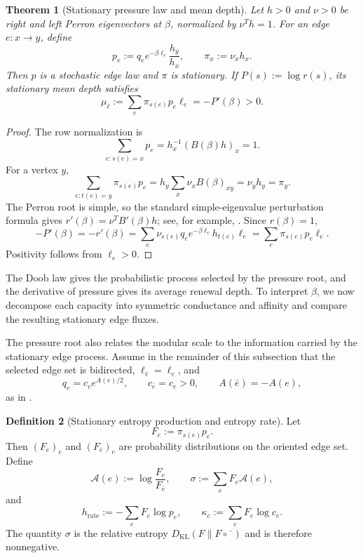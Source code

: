 \documentclass[11pt]{article}
\newtheorem{theorem}{Theorem}[section]
\theoremstyle{definition}
\newtheorem{definition}[theorem]{Definition}
\theoremstyle{remark}
\begin{document}
\begin{theorem}[Stationary pressure law and mean depth]
\label{constr:pressure-law}
Let $h>0$ and $\nu>0$ be right and left Perron eigenvectors at $\beta$,
normalized by $\nu^Th=1$.  For an edge $e:x\to y$, define
\[
 p_e:=q_e e^{-\beta\ell_e}\frac{h_y}{h_x},
 \qquad \pi_x:=\nu_xh_x.
\]
Then $p$ is a stochastic edge law and $\pi$ is stationary.  If
$P(s):=\log r(s)$, its stationary mean depth satisfies
\[
 \boxed{
 \mu_\ell:=\sum_e\pi_{s(e)}p_e\ell_e=-P'(\beta)>0.}
\]
\end{theorem}

\begin{proof}
The row normalization is
\[
 \sum_{e:s(e)=x}p_e=h_x^{-1}(B(\beta)h)_x=1.
\]
For a vertex $y$,
\[
 \sum_{e:t(e)=y}\pi_{s(e)}p_e
 =h_y\sum_x\nu_xB(\beta)_{xy}=\nu_yh_y=\pi_y.
\]
The Perron root is simple, so the standard simple-eigenvalue perturbation
formula gives $r'(\beta)=\nu^TB'(\beta)h$; see, for example,
\cite{Seneta2006}.  Since $r(\beta)=1$,
\[
 -P'(\beta)=-r'(\beta)
 =\sum_e\nu_{s(e)}q_e e^{-\beta\ell_e}h_{t(e)}\ell_e
 =\sum_e\pi_{s(e)}p_e\ell_e.
\]
Positivity follows from $\ell_e>0$.
\end{proof}

The Doob law gives the probabilistic process selected by the pressure root, and
the derivative of pressure gives its average renewal depth.  To interpret
$\beta$, we now decompose each capacity into symmetric conductance and affinity
and compare the resulting stationary edge fluxes.

The pressure root also relates the modular scale to the information carried by
the stationary edge process.  Assume in the remainder of this subsection that
the selected edge set is bidirected, $\ell_{\bar e}=\ell_e$, and
\[
 q_e=c_e e^{A(e)/2},
 \qquad c_{\bar e}=c_e>0,
 \qquad A(\bar e)=-A(e),
\]
as in .

\begin{definition}[Stationary entropy production and entropy rate]
\label{def:pressure-entropy-data}
Let
\[
 F_e:=\pi_{s(e)}p_e.
\]
Then $(F_e)_e$ and $(F_{\bar e})_e$ are probability distributions on the
oriented edge set.  Define
\[
 \mathscr A(e):=\log\frac{F_e}{F_{\bar e}},
 \qquad
 \sigma:=\sum_eF_e\mathscr A(e),
\]
and
\[
 h_{\mathrm{rate}}:=-\sum_eF_e\log p_e,
 \qquad
 \kappa_c:=\sum_eF_e\log c_e.
\]
The quantity $\sigma$ is the relative entropy
$D_{\mathrm{KL}}(F\|F\circ\bar{\phantom e})$ and is therefore nonnegative.
\end{definition}
\end{document}
